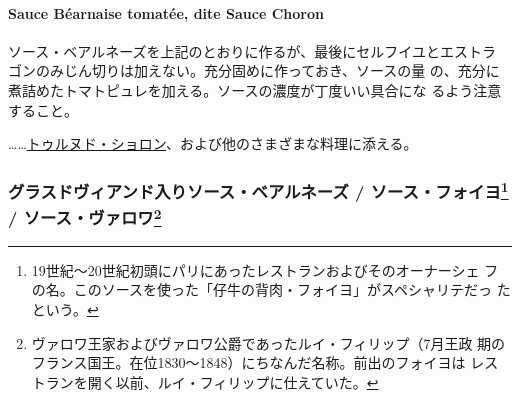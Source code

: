 \begin{recette}
\hypertarget{sauce-bearnaise-tomatee}{%
\paragraph{Sauce Béarnaise tomatée, dite Sauce
Choron}\label{sauce-bearnaise-tomatee}}


ソース・ベアルネーズを上記のとおりに作るが、最後にセルフイユとエストラ
ゴンのみじん切りは加えない。充分固めに作っておき、ソースの\unquart{}量
の、充分に煮詰めたトマトピュレを加える。ソースの濃度が丁度いい具合にな
るよう注意すること。

\ldots{}\ldots{}\href{}{トゥルヌド・ショロン}、および他のさまざまな料理に添える。

\maeaki

\hypertarget{ux30b0ux30e9ux30b9ux30c9ux30f4ux30a3ux30a2ux30f3ux30c9ux5165ux308aux30bdux30fcux30b9ux30d9ux30a2ux30ebux30cdux30fcux30ba-ux30bdux30fcux30b9ux30d5ux30a9ux30a4ux30e811-ux30bdux30fcux30b9ux30f4ux30a1ux30edux30ef12}{%
\subsubsection[グラスドヴィアンド入りソース・ベアルネーズ /
ソース・フォイヨ /
ソース・ヴァロワ]{\texorpdfstring{グラスドヴィアンド入りソース・ベアルネーズ
/ ソース・フォイヨ\footnote{19世紀〜20世紀初頭にパリにあったレストランおよびそのオーナーシェ
  フの名。このソースを使った「仔牛の背肉・フォイヨ」がスペシャリテだっ
  たという。} / ソース・ヴァロワ\footnote{ヴァロワ王家およびヴァロワ公爵であったルイ・フィリップ（7月王政
  期のフランス国王。在位1830〜1848）にちなんだ名称。前出のフォイヨは
  レストランを開く以前、ルイ・フィリップに仕えていた。}}{グラスドヴィアンド入りソース・ベアルネーズ / ソース・フォイヨ / ソース・ヴァロワ}}\label{ux30b0ux30e9ux30b9ux30c9ux30f4ux30a3ux30a2ux30f3ux30c9ux5165ux308aux30bdux30fcux30b9ux30d9ux30a2ux30ebux30cdux30fcux30ba-ux30bdux30fcux30b9ux30d5ux30a9ux30a4ux30e811-ux30bdux30fcux30b9ux30f4ux30a1ux30edux30ef12}}

\hypertarget{sauce-bearnaise-a-la-glace-de-viande}{%
}
\end{recette}
